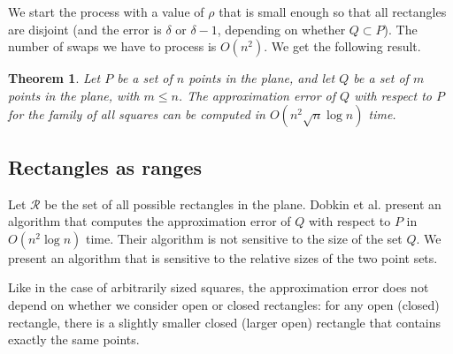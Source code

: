 \documentclass{elsart}
\newcommand{\ranges}{{\mathcal R}}
\newtheorem{theorem}[definition]{Theorem}
\begin{document}
We start the process with a value of $\rho$ that is small enough so
that all rectangles are disjoint (and the error is $\delta$ or
$\delta-1$, depending on whether $Q\subset P$). The number of swaps we
have to process is $O(n^2)$. We get the following result.
\begin{theorem}\label{th:squares}
Let $P$ be a set of $n$ points in the plane, and let $Q$ be a set of
$m$ points in the plane, with $m \leq n$.  The approximation error of
$Q$ with respect to $P$ for the family of all squares can be computed
in $O(n^2\sqrt{n}\log n)$ time.
\end{theorem}

\subsection{Rectangles as ranges}
\label{subse:rectangles}
Let $\ranges$ be the set of all possible rectangles in the plane.
Dobkin et al. \cite{dgm96} present an algorithm that computes
the approximation error of $Q$ with respect to $P$ in $O(n^2\log n)$ time.
Their algorithm is not sensitive to the size of the set $Q$. We 
present an algorithm that is sensitive to the relative sizes of
the two point sets.

Like in the case of arbitrarily sized squares, the approximation error does not
depend on whether we consider open or closed rectangles: for any open (closed)
rectangle, there is a slightly smaller closed (larger open) rectangle
that contains exactly the same points.
\end{document}
